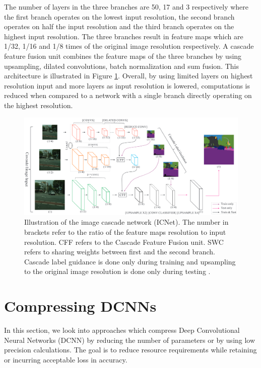 The number of layers in the three branches are 50, 17 and 3 respectively where the first branch operates on the lowest input resolution, the second branch operates on half the input resolution and the third branch operates on the highest input resolution. The three branches result in feature maps which are 1/32, 1/16 and 1/8 times of the original image resolution respectively. A cascade feature fusion unit combines the feature maps of the three branches by using upsampling, dilated convolutions, batch normalization and sum fusion. This architecture is illustrated in Figure \ref{Fig:icnet}. Overall, by using limited layers on highest resolution input and more layers as input resolution is lowered, computations is reduced when compared to a network with a single branch directly operating on the highest resolution. 

	\begin{figure}[h]
		\centering
		\includegraphics[width=1\linewidth]{images/icnet}
		\caption{Illustration of the image cascade network (ICNet). The number in brackets refer to the ratio of the feature maps resolution to input resolution. CFF refers to the Cascade Feature Fusion unit. SWC refers to sharing weights between first and the second branch. Cascade label guidance is done only during training and upsampling to the original image resolution is done only during testing \cite{DBLP:journals/corr/ZhaoQSSJ17}.}
		\label{Fig:icnet}
	\end{figure}

\section{Compressing DCNNs}
\label{section:compress}

In this section, we look into approaches which compress Deep Convolutional Neural Networks (DCNN) by reducing the number of parameters or by using low precision calculations. The goal is to reduce resource requirements while retaining or incurring acceptable loss in accuracy. 

